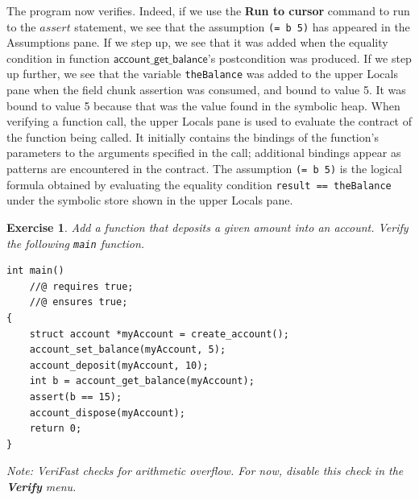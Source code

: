 \documentclass{article}
\newtheorem{exercise}{Exercise}
\begin{document}
The program now verifies. Indeed, if we use the \textbf{Run to
cursor} command to run to the $\mathit{assert}$ statement, we
see that the assumption \lstinline!(= b 5)! has appeared in the
Assumptions pane. If we step up, we see that it was added when
the equality condition in function
$\mathsf{account\_get\_balance}$'s postcondition was produced.
If we step up further, we see that the variable
\lstinline!theBalance! was added to the upper Locals pane when
the field chunk assertion was consumed, and bound to value 5.
It was bound to value 5 because that was the value found in the
symbolic heap. When verifying a function call, the upper Locals
pane is used to evaluate the contract of the function being
called. It initially contains the bindings of the function's
parameters to the arguments specified in the call; additional
bindings appear as patterns are encountered in the contract.
The assumption \lstinline!(= b 5)! is the logical formula
obtained by evaluating the equality condition %
\lstinline!result == theBalance! under the symbolic store shown
in the upper Locals pane.

\begin{exercise}\label{exercise:deposit}
Add a function that deposits a given amount into an account.
Verify the following \lstinline!main! function.
\begin{lstlisting}[basicstyle=\ttfamily\upshape]
int main()
    //@ requires true;
    //@ ensures true;
{
    struct account *myAccount = create_account();
    account_set_balance(myAccount, 5);
    account_deposit(myAccount, 10);
    int b = account_get_balance(myAccount);
    assert(b == 15);
    account_dispose(myAccount);
    return 0;
}
\end{lstlisting}
Note: VeriFast checks for arithmetic overflow. For now, disable
this check in the \textbf{Verify} menu.
\end{exercise}
\end{document}
